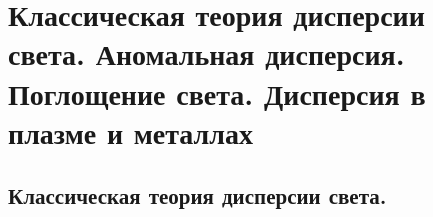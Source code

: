 \section{Классическая теория дисперсии света. Аномальная дисперсия. Поглощение света. Дисперсия в плазме и металлах}
\subsection{Классическая теория дисперсии света.}